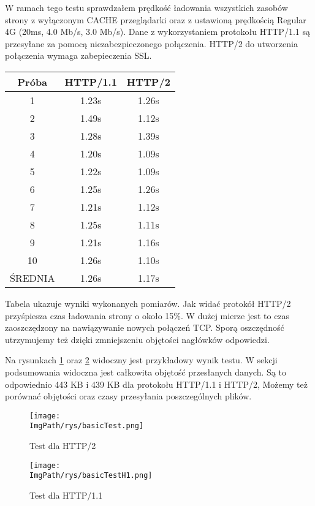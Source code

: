 \documentclass[a4paper,12pt,twoside,openany]{report}
\newcommand{\ImgPath}{.}
\begin{document}
W ramach tego testu sprawdzałem prędkość ładowania wszystkich zasobów strony z wyłączonym CACHE przeglądarki oraz z ustawioną prędkością Regular 4G (20ms, 4.0 Mb/s, 3.0 Mb/s).
Dane z wykorzystaniem protokołu HTTP/1.1 są przesyłane za pomocą niezabezpieczonego połączenia.
HTTP/2 do utworzenia połączenia wymaga zabepieczenia SSL.

\begin{tabular}{c|c|c}
Próba & HTTP/1.1 & HTTP/2 \\ \hline
1 & 1.23s & 1.26s\\
2 & 1.49s & 1.12s\\
3 & 1.28s & 1.39s\\
4 & 1.20s & 1.09s\\
5 & 1.22s & 1.09s\\
6 & 1.25s & 1.26s\\
7 & 1.21s & 1.12s\\
8 & 1.25s & 1.11s\\
9 & 1.21s & 1.16s\\
10 & 1.26s & 1.10s\\ \hline
ŚREDNIA & 1.26s & 1.17s\\
\end{tabular}

Tabela ukazuje wyniki wykonanych pomiarów.
Jak widać protokół HTTP/2 przyśpiesza czas ładowania strony o około 15\%.
W dużej mierze jest to czas zaoszczędzony na nawiązywanie nowych połączeń TCP.
Sporą oszczędność utrzymujemy też dzięki zmniejszeniu objętości nagłówków odpowiedzi.

Na rysunkach \ref{schematBasicTest} oraz \ref{schematBasicTestH1} widoczny jest przykładowy wynik testu.
W sekcji podsumowania widoczna jest całkowita objętość przesłanych danych. Są to odpowiednio 443 KB i 439 KB dla protokołu HTTP/1.1 i HTTP/2,
Możemy też porównać objętości oraz czasy przesyłania poszczególnych plików.

\begin{figure}[!htbp]
	\begin{center}
\centering
\texttt{[image: \\ImgPath/rys/basicTest.png]}
\end{center}
	\caption{Test dla HTTP/2}
	\label{schematBasicTest}
\end{figure}

\begin{figure}[!htbp]
	\begin{center}
\centering
\texttt{[image: \\ImgPath/rys/basicTestH1.png]}
\end{center}
	\caption{Test dla HTTP/1.1}
	\label{schematBasicTestH1}
\end{figure}
\end{document}

